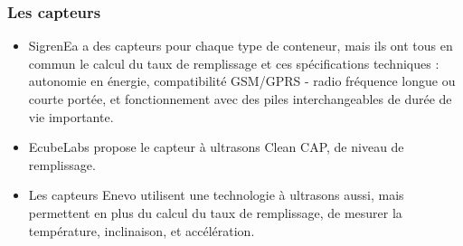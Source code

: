 \documentclass[a4paper,12pt]{report}
\begin{document}
\subsubsection*{Les capteurs}
\begin{itemize}
\item SigrenEa a des capteurs pour chaque type de conteneur, mais ils ont tous en commun le calcul du taux de remplissage et ces spécifications techniques : autonomie en énergie, compatibilité GSM/GPRS - radio fréquence longue ou courte portée, et fonctionnement avec des piles interchangeables de durée de vie importante.
\item EcubeLabs propose le capteur à ultrasons Clean CAP, de niveau de remplissage.
\item Les capteurs Enevo utilisent une technologie à ultrasons aussi, mais permettent en plus du calcul du taux de remplissage, de mesurer la température, inclinaison, et accélération. 
\end{itemize}
\end{document}
